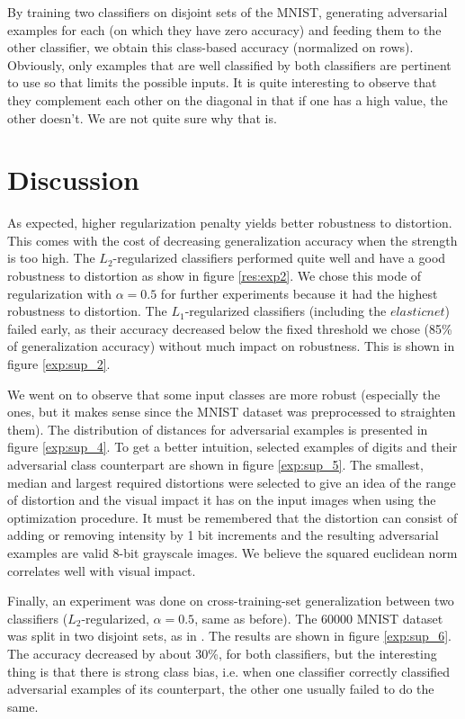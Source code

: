 \documentclass{article} %
\begin{document}
By training two classifiers on disjoint sets of the MNIST, generating adversarial examples for each (on which they have zero accuracy) and feeding them to the other classifier, we obtain this class-based accuracy (normalized on rows). Obviously, only examples that are well classified by both classifiers are pertinent to use so that limits the possible inputs. It is quite interesting to observe that they complement each other on the diagonal in that if one has a high value, the other doesn't. We are not quite sure why that is.


\null
\vfill
\newpage


\section{Discussion}

As expected, higher regularization penalty yields better robustness to distortion. This comes with the cost of decreasing generalization accuracy when the strength is too high. 
The $L_2$-regularized classifiers performed quite well and have a good robustness to distortion as
show in figure \ref{res:exp2}. We chose this mode of regularization with $\alpha=0.5$ for further experiments because it had the highest robustness to distortion.
The $L_1$-regularized classifiers (including the $elasticnet$) failed early, as their accuracy decreased below the fixed threshold we chose (85\% of generalization accuracy) without much impact on robustness. This is shown in figure \ref{exp:sup_2}.

We went on to observe that some input classes are more robust (especially the ones, but it makes sense since the MNIST dataset was preprocessed to straighten them). The distribution of distances for adversarial examples is presented in figure \ref{exp:sup_4}. To get a better intuition, selected examples of digits and their adversarial class counterpart are shown in figure \ref{exp:sup_5}. The smallest, median and largest required distortions were selected to give an idea of the range of distortion and the visual impact it has on the input images when using the optimization procedure. It must be remembered that the distortion can consist of adding or removing intensity by 1 bit increments and the resulting adversarial examples are valid 8-bit grayscale images. We believe the squared euclidean norm correlates well with visual impact.



Finally, an experiment was done on cross-training-set generalization between two classifiers ($L_2$-regularized, $\alpha=0.5$, same as before). The 60000 MNIST dataset was split in two disjoint sets, as in \citep{szegedy_intriguing_2013}. The results are shown in figure \ref{exp:sup_6}. The accuracy
decreased by about 30\%, for both classifiers, but the interesting thing is that there is strong class bias, i.e. when one classifier correctly classified adversarial examples of its counterpart, the other one usually failed to do the same.
\end{document}
